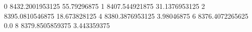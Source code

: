 0 8432.2001953125 55.79296875
1 8407.544921875 31.1376953125
2 8395.0810546875 18.673828125
4 8380.3876953125 3.98046875
6 8376.4072265625 0.0
8 8379.8505859375 3.443359375
